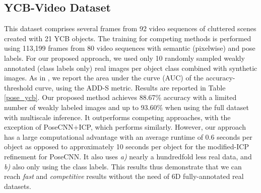 \documentclass[letterpaper, 10 pt, conference]{ieeeconf}  %
\newcommand{\phil}[1]{\textcolor{blue}{#1}}
\begin{document}
\subsection{YCB-Video Dataset}%
This dataset comprises several frames from 92 video sequences of cluttered scenes created with 21 YCB objects. The training for competing methods \cite{xiang2017posecnn, oberweger2018making, drost2010model} is performed using 113,199 frames from 80 video sequences with semantic (pixelwise) and pose labels. For our proposed approach, we used only 10 randomly sampled weakly annotated (class labels only) real images per object class combined with synthetic images. As in \cite{xiang2017posecnn}, we report the area under the curve (AUC) of the accuracy-threshold curve, using the ADD-S metric.
Results are reported in Table \ref{pose_ycb}. Our proposed method achieves 88.67\% accuracy with a limited number of weakly labeled images and up to 93.60\% when using the full dataset with multiscale inference. It outperforms competing approaches, with the exception of PoseCNN+ICP, which performs similarly. However, our approach has a large computational advantage with an average runtime of 0.6 seconds per object as opposed to approximately 10 seconds per object for the modified-ICP refinement for PoseCNN. It also uses \emph{a)} nearly a hundredfold less real data, and \emph{b)} also only using the class labels. This results thus demonstrate that we can reach \emph{fast} and \emph{competitive} results without the need of 6D fully-annotated real datasets.
\end{document}
